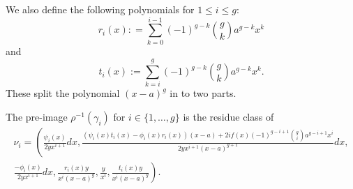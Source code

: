 We also define the following polynomials for $1 \leq i \leq g$:
    \[
    r_i(x) : = \sum_{k=0}^{i-1} (-1)^{g-k}\binom{g}{k} a^{g-k} x^k
    \]
and
    \[
    t_i(x) := \sum_{k=i}^{g} (-1)^{g-k}\binom{g}{k} a^{g-k} x^k.
    \]
These split the polynomial $(x-a)^g$ in to two parts.


    \begin{prop}\label{propbasisoftriplecoverderham}
    The pre-image $\rho^{-1}(\gamma_i)$ for $i \in \{1, \ldots, g\}$ is the residue class of
        \begin{multline*}
        \nu_i = \left(\frac{\psi_i(x)}{2yx^{i+1}}dx, \frac{(\psi_i(x)t_i(x) - \phi_i(x)r_i(x))(x-a) + 2if(x)(-1)^{g-i+1}\binom{g}{i} a^{g-i+1}x^i}{2yx^{i+1}(x-a)^{g+1}}dx,\right. \\\left. \frac{-\phi_i(x)}{2yx^{i+1}}dx,  \frac{r_i(x)y}{x^i(x-a)^g}, \frac{y}{x^i},  \frac{t_i(x)y}{x^i(x-a)^g} \right).
        \end{multline*}
    \end{prop}
